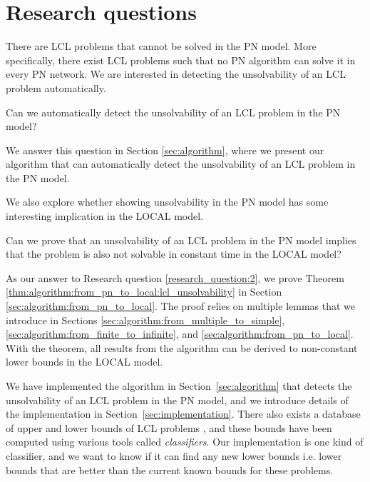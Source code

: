 
\section{Research questions} \label{sec:research_question}

There are LCL problems that cannot be solved in the PN model.
More specifically, there exist LCL problems such that no PN algorithm can solve it in every PN network.
We are interested in detecting the unsolvability of an LCL problem automatically.

\begin{researchquestion} \label{research_question:1}
Can we automatically detect the unsolvability of an LCL problem in the PN model?
\end{researchquestion}

We answer this question in Section \ref{sec:algorithm}, where we present our algorithm that can automatically detect the unsolvability of an LCL problem in the PN model.

We also explore whether showing unsolvability in the PN model has some interesting implication in the LOCAL model.

\begin{researchquestion} \label{research_question:2}
Can we prove that an unsolvability of an LCL problem in the PN model implies that the problem is also not solvable in constant time in the LOCAL model?
\end{researchquestion}

As our answer to Research question \ref{research_question:2}, we prove Theorem \ref{thm:algorithm:from_pn_to_local:lcl_unsolvability} in Section \ref{sec:algorithm:from_pn_to_local}.
The proof relies on multiple lemmas that we introduce in Sections \ref{sec:algorithm:from_multiple_to_simple}, \ref{sec:algorithm:from_finite_to_infinite}, and \ref{sec:algorithm:from_pn_to_local}.
With the theorem, all results from the algorithm can be derived to non-constant lower bounds in the LOCAL model.

We have implemented the algorithm in Section~\ref{sec:algorithm} that detects the unsolvability of an LCL problem in the PN model, and we introduce details of the implementation in Section~\ref{sec:implementation}.
There also exists a database of upper and lower bounds of LCL problems \cite{Tereshchenko2021}, and these bounds have been computed using various tools called \emph{classifiers}.
Our implementation is one kind of classifier, and we want to know if it can find any new lower bounds i.e. lower bounds that are better than the current known bounds for these problems.

